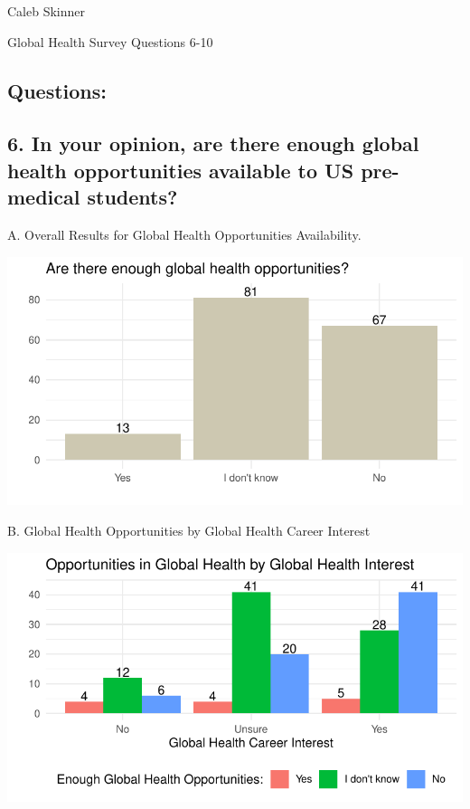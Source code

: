 \documentclass[
  letterpaper,
  DIV=11,
  numbers=noendperiod]{scrartcl}
\author{}
\date{}
\begin{document}
\ifdefined\Shaded\renewenvironment{Shaded}{\begin{tcolorbox}[sharp corners, boxrule=0pt, breakable, frame hidden, interior hidden, enhanced, borderline west={3pt}{0pt}{shadecolor}]}{\end{tcolorbox}}\fi

Caleb Skinner

Global Health Survey Questions 6-10

\hypertarget{questions}{%
\subsection{Questions:}\label{questions}}

\hypertarget{in-your-opinion-are-there-enough-global-health-opportunities-available-to-us-pre-medical-students}{%
\subsection{6. In your opinion, are there enough global health
opportunities available to US pre-medical
students?}\label{in-your-opinion-are-there-enough-global-health-opportunities-available-to-us-pre-medical-students}}

A. Overall Results for Global Health Opportunities Availability.

\includegraphics{GlobalHealthQuarto6-10_files/figure-pdf/unnamed-chunk-2-1.pdf}

\newpage

B. Global Health Opportunities by Global Health Career Interest

\includegraphics{GlobalHealthQuarto6-10_files/figure-pdf/unnamed-chunk-3-1.pdf}
\end{document}
